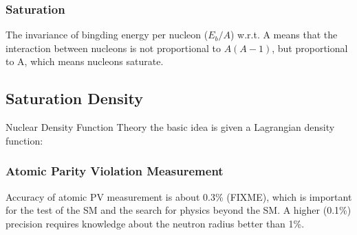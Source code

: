 \subsubsection{Saturation}
The invariance of bingding energy per nucleon ($E_b/A$) w.r.t. A means that
the interaction between nucleons is not proportional to $A(A-1)$, but proportional
to A, which means nucleons saturate.
\subsection{Saturation Density}
Nuclear Density Function Theory
the basic idea is given a Lagrangian density function:

\subsubsection{Atomic Parity Violation Measurement}
Accuracy of atomic PV measurement is about 0.3\% (FIXME), which is important
for the test of the SM and the search for physics beyond the SM. A higher (0.1\%)
precision requires knowledge about the neutron radius better than 1\%. \cite{PhysRevC.46.2587}
